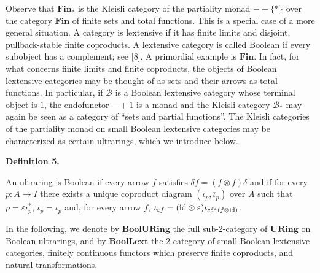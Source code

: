 \documentclass[10pt,a4paper]{amsart}
\begin{document}
 
 
Observe that $\mathbf{Fin}_{\ast}$ is the Kleisli category of the partiality monad $-+\{\ast\}$ over the category $\mathbf{Fin}$ of finite sets and total functions. This is a special case of a more general situation. A category is lextensive if it has finite limits and disjoint, pullback-stable finite coproducts. A lextensive category is called Boolean if every subobject has a complement; see [8]. A primordial example is $\mathbf{Fin}$. In fact, for what concerns finite limits and finite coproducts, the objects of Boolean lextensive categories may be thought of as sets and their arrows as total functions. In particular, if $\mathcal{B}$ is a Boolean lextensive category whose terminal object is $1$, the endofunctor $-+1$ is a monad and the Kleisli category $\mathcal{B}_{\ast}$ may again be seen as a category of “sets and partial functions”. The Kleisli categories of the partiality monad on small Boolean lextensive categories may be characterized as certain ultrarings, which we introduce below.\par
 
 
 
\par\medskip\noindent\textbf{Definition 5.}\par
 
 
An ultraring is Boolean if every arrow $f$ satisfies $\delta f=(f\otimes f)\delta$ and if for every $p:A\to I$ there exists a unique coproduct diagram $(\iota_{p},\overline{\iota}_{p})$ over $A$ such that $p=\varepsilon\iota_{p}^{\ast}$, $\overline{\iota}_{p}=\iota_{\overline{p}}$ and, for every arrow $f$, $\iota_{\varepsilon f}=(\mathrm{id}\otimes\varepsilon)\iota_{\varepsilon\delta^%
{\ast}(f\otimes\mathrm{id})}$.\par
 
 
 
 
In the following, we denote by $\mathbf{BoolURing}$ the full sub-$2$-category of $\mathbf{URing}$ on Boolean ultrarings, and by $\mathbf{BoolLext}$ the $2$-category of small Boolean lextensive categories, finitely continuous functors which preserve finite coproducts, and natural transformations.\par
 
\end{document}
